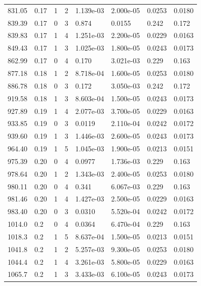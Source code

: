 \documentclass[preview]{standalone}
\begin{document}
{{{\begin{tabular}{L{1.2cm}C{1.2cm} C{0.3cm}C{0.5cm} C{1.4cm}C{1.4cm} C{1.4cm}C{1.4cm}}
  831.05  &  0.17  & 1     &  2 &  1.139e-03  & 2.000e-05  & 0.0253 &  0.0180   \\ 
  839.39  &  0.17  & 0     &  3 &  0.874  & 0.0155  & 0.242 &  0.172   \\ 
  839.83  &  0.17  & 1     &  4 &  1.251e-03  & 2.200e-05  & 0.0229 &  0.0163   \\ 
  849.43  &  0.17  & 1     &  3 &  1.025e-03  & 1.800e-05  & 0.0243 &  0.0173   \\ 
  862.99  &  0.17  & 0     &  4 &  0.170  & 3.021e-03  & 0.229 &  0.163   \\ 
  877.18  &  0.18  & 1     &  2 &  8.718e-04  & 1.600e-05  & 0.0253 &  0.0180   \\ 
  886.78  &  0.18  & 0     &  3 &  0.172  & 3.050e-03  & 0.242 &  0.172   \\ 
  919.58  &  0.18  & 1     &  3 &  8.603e-04  & 1.500e-05  & 0.0243 &  0.0173   \\ 
  927.89  &  0.19  & 1     &  4 &  2.077e-03  & 3.700e-05  & 0.0229 &  0.0163   \\ 
  933.85  &  0.19  & 0     &  3 &  0.0119  & 2.110e-04  & 0.0242 &  0.0172   \\ 
  939.60  &  0.19  & 1     &  3 &  1.446e-03  & 2.600e-05  & 0.0243 &  0.0173   \\ 
  964.40  &  0.19  & 1     &  5 &  1.045e-03  & 1.900e-05  & 0.0213 &  0.0151   \\ 
  975.39  &  0.20  & 0     &  4 &  0.0977  & 1.736e-03  & 0.229 &  0.163   \\ 
  978.64  &  0.20  & 1     &  2 &  1.343e-03  & 2.400e-05  & 0.0253 &  0.0180   \\ 
  980.11  &  0.20  & 0     &  4 &  0.341  & 6.067e-03  & 0.229 &  0.163   \\ 
  981.46  &  0.20  & 1     &  4 &  1.427e-03  & 2.500e-05  & 0.0229 &  0.0163   \\ 
  983.40  &  0.20  & 0     &  3 &  0.0310  & 5.520e-04  & 0.0242 &  0.0172   \\ 
  1014.0  &   0.2  & 0     &  4 &  0.0364  & 6.470e-04  & 0.229 &  0.163   \\ 
  1018.3  &   0.2  & 1     &  5 &  8.637e-04  & 1.500e-05  & 0.0213 &  0.0151   \\ 
  1041.8  &   0.2  & 1     &  2 &  5.257e-03  & 9.300e-05  & 0.0253 &  0.0180   \\ 
  1044.4  &   0.2  & 1     &  4 &  3.261e-03  & 5.800e-05  & 0.0229 &  0.0163   \\ 
  1065.7  &   0.2  & 1     &  3 &  3.433e-03  & 6.100e-05  & 0.0243 &  0.0173   \\ 

\end{tabular}}}}
\end{document}
